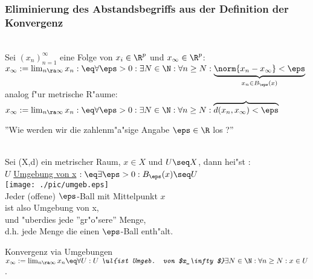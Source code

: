 \subsubsection{Eliminierung des Abstandsbegriffs aus der Definition der Konvergenz}
\begin{definition}\label{1.5}\\
Sei $(x_n)_{n=1}^\infty$ eine Folge von $x_i\in\R^p$ und $x_\infty\in\R^p$:\\
$x_\infty :=\lim_{n\ra\infty }x_n:\eq \forall\eps >0:\exists N\in\N:\forall n\geq N:\underbrace{\norm{x_n-x_\infty }<\eps}_{x_n\in B_\eps (x)}$\vspace*{-0.5cm}\\
analog f"ur metrische R"aume:\\
$x_\infty :=\lim_{n\ra\infty }x_n:\eq \forall\eps >0:\exists N\in\N:\forall n\geq N:\overbrace{d(x_n,x_\infty )<\eps}$
\end{definition}
''Wie werden wir die zahlenm"a"sige Angabe $ \eps\in\R $ los ?''
\begin{definition}\label{1.6}\\
Sei (X,d) ein metrischer Raum, $x\in X$ und $U\seq X$, dann hei"st :\\$U$ \ul{Umgebung von x} $:\eq \exists\eps >0:B_\eps (x)\seq U$\vspace*{-0.5cm}\\
\hspace*{8cm}\texttt{[image: ./pic/umgeb.eps]}\vspace*{-4cm}\\
Jeder (offene) $\eps$-Ball mit Mittelpunkt $x$\\
ist also Umgebung von x,\\
und "uberdies jede ''gr"o"sere'' Menge,\\
d.h. jede Menge die einen $\eps$-Ball enth"alt.
\end{definition}
\vspace*{1cm}
\begin{prop}\label{1.7}{Konvergenz via Umgebungen}\\
$x_\infty :=\lim _{n\ra\infty}x_n\eq \forall U:\mbox{\it $U$ \ul{ist Umgeb. von $x_\infty$}}\exists N\in\N:\forall n\geq N: x\in U$.
\end{prop}
